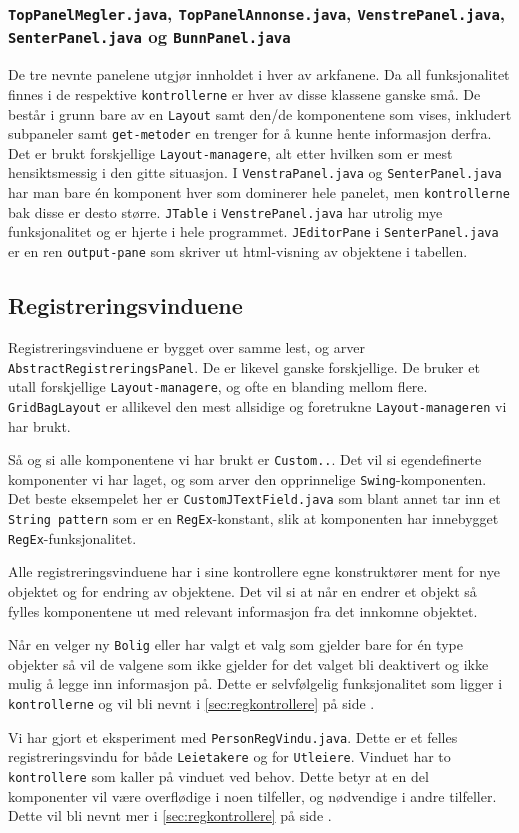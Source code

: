 \subsubsection*{\texttt{TopPanelMegler.java}, \texttt{TopPanelAnnonse.java}, \texttt{VenstrePanel.java}, \texttt{SenterPanel.java} og \texttt{BunnPanel.java}}
De tre nevnte panelene utgjør innholdet i hver av arkfanene. 
Da all funksjonalitet finnes i de respektive \texttt{kontrollerne} er hver av disse klassene ganske små. De består i grunn bare av en \texttt{Layout} samt den/de komponentene som vises, inkludert subpaneler samt \texttt{get-metoder} en trenger for å kunne hente informasjon derfra.
Det er brukt forskjellige \texttt{Layout-managere}, alt etter hvilken som er mest hensiktsmessig i den gitte situasjon.
I \texttt{VenstraPanel.java} og \texttt{SenterPanel.java} har man bare én komponent hver som dominerer hele panelet, men \texttt{kontrollerne} bak disse er desto større.
\texttt{JTable} i \texttt{VenstrePanel.java} har utrolig mye funksjonalitet og er hjerte i hele programmet.
\texttt{JEditorPane} i \texttt{SenterPanel.java} er en ren \texttt{output-pane} som skriver ut html-visning av objektene i tabellen. 


\subsection{Registreringsvinduene}
Registreringsvinduene er bygget over samme lest, og arver \texttt{AbstractRegistreringsPanel}. De er likevel ganske forskjellige. De bruker et utall forskjellige \texttt{Layout-managere}, og ofte en blanding mellom flere. 
\texttt{GridBagLayout} er allikevel den mest allsidige og foretrukne \texttt{Layout-manageren} vi har brukt. 

Så og si alle komponentene vi har brukt er \texttt{Custom..}. Det vil si egendefinerte komponenter vi har laget, og som arver den opprinnelige \texttt{Swing}-komponenten. 
Det beste eksempelet her er \texttt{CustomJTextField.java} som blant annet tar inn et \texttt{String pattern} som er en \texttt{RegEx}-konstant, slik at komponenten har innebygget \texttt{RegEx}-funksjonalitet.

Alle registreringsvinduene har i sine kontrollere egne konstruktører ment for nye objektet og for endring av objektene. Det vil si at når en endrer et objekt så fylles komponentene ut med relevant informasjon fra det innkomne objektet.

Når en velger ny \texttt{Bolig} eller har valgt et valg som gjelder bare for én type objekter så vil de valgene som ikke gjelder for det valget bli deaktivert og ikke mulig å legge inn informasjon på. Dette er selvfølgelig funksjonalitet som ligger i \texttt{kontrollerne} og vil bli nevnt i \ref{sec:regkontrollere} på side \pageref{sec:regkontrollere}.

Vi har gjort et eksperiment med \texttt{PersonRegVindu.java}. 
Dette er et felles registreringsvindu for både \texttt{Leietakere} og for \texttt{Utleiere}. Vinduet har to \texttt{kontrollere} som kaller på vinduet ved behov.
Dette betyr at en del komponenter vil være overflødige i noen tilfeller, og nødvendige i andre tilfeller. Dette vil bli nevnt mer i \ref{sec:regkontrollere} på side \pageref{sec:regkontrollere}.

